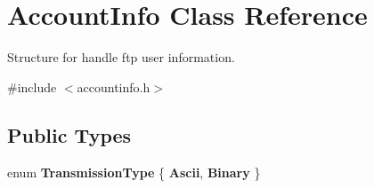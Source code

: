 \hypertarget{classAccountInfo}{}\section{Account\+Info Class Reference}
\label{classAccountInfo}


Structure for handle ftp user information.  




{\ttfamily \#include $<$accountinfo.\+h$>$}

\subsection*{Public Types}
\begin{DoxyCompactItemize}
\item 
\mbox{\label{classAccountInfo_a7c804c71299c02010e99514eafb04a63}} 
enum {\bfseries Transmission\+Type} \{ {\bfseries Ascii}, 
{\bfseries Binary}
 \}
\end{DoxyCompactItemize}
